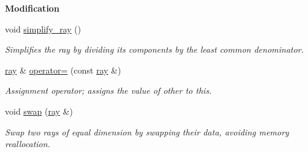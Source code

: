 \begin{Indent}\textbf{ Modification}\par
\begin{DoxyCompactItemize}
\item 
\mbox{\label{group___c_l_s_solvers_a99cfe50a0abd150d7effd8911664c2db}} 
void \hyperlink{group___c_l_s_solvers_a99cfe50a0abd150d7effd8911664c2db}{simplify\+\_\+ray} ()
\begin{DoxyCompactList}\small\item\em Simplifies the ray by dividing its components by the least common denominator. \end{DoxyCompactList}\item 
\hyperlink{group___c_l_s_solvers_classray}{ray} \& \hyperlink{group___c_l_s_solvers_a83fa2d552fda75b973fe659c39ff9960}{operator=} (const \hyperlink{group___c_l_s_solvers_classray}{ray} \&)
\begin{DoxyCompactList}\small\item\em Assignment operator; assigns the value of {\ttfamily other} to {\ttfamily this}. \end{DoxyCompactList}\item 
void \hyperlink{group___c_l_s_solvers_a3f95b591c0b92d2ea8cc04b1c9b0d179}{swap} (\hyperlink{group___c_l_s_solvers_classray}{ray} \&)
\begin{DoxyCompactList}\small\item\em Swap two rays of equal dimension by swapping their data, avoiding memory reallocation. \end{DoxyCompactList}\end{DoxyCompactItemize}
\end{Indent}
